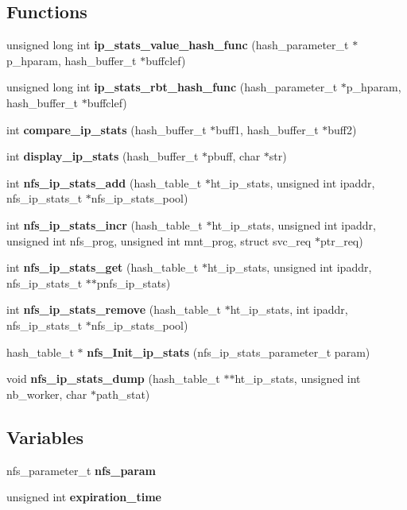 \subsection*{Functions}
\begin{CompactItemize}
\item 
unsigned long int {\bf ip\_\-stats\_\-value\_\-hash\_\-func} (hash\_\-parameter\_\-t $\ast$p\_\-hparam, hash\_\-buffer\_\-t $\ast$buffclef)
\item 
unsigned long int {\bf ip\_\-stats\_\-rbt\_\-hash\_\-func} (hash\_\-parameter\_\-t $\ast$p\_\-hparam, hash\_\-buffer\_\-t $\ast$buffclef)
\item 
int {\bf compare\_\-ip\_\-stats} (hash\_\-buffer\_\-t $\ast$buff1, hash\_\-buffer\_\-t $\ast$buff2)
\item 
int {\bf display\_\-ip\_\-stats} (hash\_\-buffer\_\-t $\ast$pbuff, char $\ast$str)
\item 
int {\bf nfs\_\-ip\_\-stats\_\-add} (hash\_\-table\_\-t $\ast$ht\_\-ip\_\-stats, unsigned int ipaddr, nfs\_\-ip\_\-stats\_\-t $\ast$nfs\_\-ip\_\-stats\_\-pool)
\item 
int {\bf nfs\_\-ip\_\-stats\_\-incr} (hash\_\-table\_\-t $\ast$ht\_\-ip\_\-stats, unsigned int ipaddr, unsigned int nfs\_\-prog, unsigned int mnt\_\-prog, struct svc\_\-req $\ast$ptr\_\-req)
\item 
int {\bf nfs\_\-ip\_\-stats\_\-get} (hash\_\-table\_\-t $\ast$ht\_\-ip\_\-stats, unsigned int ipaddr, nfs\_\-ip\_\-stats\_\-t $\ast$$\ast$pnfs\_\-ip\_\-stats)
\item 
int {\bf nfs\_\-ip\_\-stats\_\-remove} (hash\_\-table\_\-t $\ast$ht\_\-ip\_\-stats, int ipaddr, nfs\_\-ip\_\-stats\_\-t $\ast$nfs\_\-ip\_\-stats\_\-pool)
\item 
hash\_\-table\_\-t $\ast$ {\bf nfs\_\-Init\_\-ip\_\-stats} (nfs\_\-ip\_\-stats\_\-parameter\_\-t param)
\item 
void {\bf nfs\_\-ip\_\-stats\_\-dump} (hash\_\-table\_\-t $\ast$$\ast$ht\_\-ip\_\-stats, unsigned int nb\_\-worker, char $\ast$path\_\-stat)
\end{CompactItemize}
\subsection*{Variables}
\begin{CompactItemize}
\item 
nfs\_\-parameter\_\-t {\bf nfs\_\-param}
\item 
unsigned int {\bf expiration\_\-time}
\end{CompactItemize}


